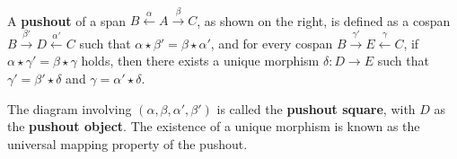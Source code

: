 \begin{definition}
    \label{def:cat:po}
    \ \newline
\noindent
\begin{minipage}{0.7\textwidth}  
    A \textbf{pushout} of a span \( B \overset{\alpha}{\leftarrow} A \overset{\beta}{\rightarrow} C \), as shown on the right, is defined as a cospan \( B \overset{\beta'}{\rightarrow} D \overset{\alpha'}{\leftarrow} C \) such that \( \alpha \star \beta' = \beta \star \alpha' \), and for every cospan \( B \overset{\gamma'}{\rightarrow} E \overset{\gamma}{\leftarrow} C \), if \( \alpha \star \gamma' = \beta \star \gamma \) holds, then there exists a unique morphism \(\delta : D \to E\) such that \( \gamma' = \beta' \star \delta \) and \( \gamma = \alpha' \star \delta \).
\end{minipage}
\hfill
\begin{minipage}{0.299\textwidth}
    \hfill
{}
\end{minipage}
The diagram involving \( (\alpha, \beta, \alpha', \beta') \) is called the \textbf{pushout square}, with \(D\) as the \textbf{pushout object}. The existence of a unique morphism is known as the universal mapping property of the pushout.
\end{definition} 

